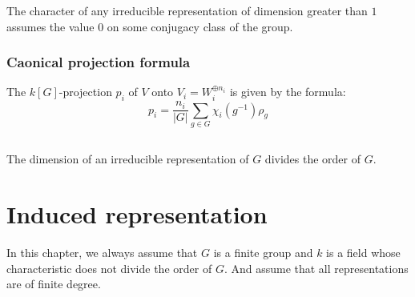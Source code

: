 \documentclass[12pt, oneside]{book}
\begin{document}
\begin{proposition}
    The character of any irreducible representation of dimension greater than $1$ assumes the value $0$ on some conjugacy class of the group.
\end{proposition}


\subsection{Caonical projection formula }
\begin{proposition}
    The $k[G]$-projection $p_i$ of $V$ onto $V_i=W_i^{\oplus n_i}$ is given by the formula:
    \begin{equation*}
        p_i=\frac{n_i}{\left|G\right|} \sum_{g \in G} \chi_i(g^{-1}) \rho_g
    \end{equation*}
\end{proposition}

\section{}

\begin{proposition}
    The dimension of an irreducible representation of $G$ divides the order of $G$.
\end{proposition}








\chapter{Induced representation}
In this chapter, we always assume that $G$ is a finite group and $k$ is a field whose characteristic does not divide the order of $G$.
And assume that all representations are of finite degree.
\end{document}
